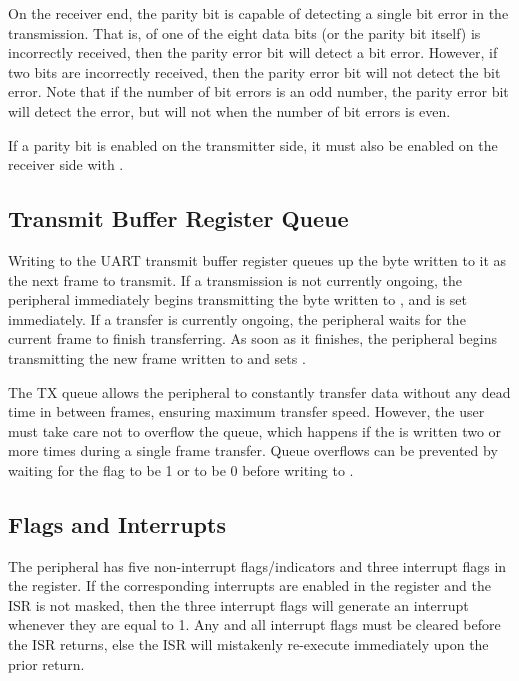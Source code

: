 On the receiver end, the parity bit is capable of detecting a single bit error in the transmission. That is, of one of the eight data bits (or the parity bit itself) is incorrectly received, then the parity error bit  will detect a bit error. However, if two bits are incorrectly received, then the parity error bit will not detect the bit error. Note that if the number of bit errors is an odd number, the parity error bit will detect the error, but will not when the number of bit errors is even.

If a parity bit is enabled on the transmitter side, it must also be enabled on the receiver side with .



\subsection{Transmit Buffer Register Queue}

Writing to the UART transmit buffer register  queues up the byte written to it as the next frame to transmit. If a transmission is not currently ongoing, the  peripheral immediately begins transmitting the byte written to , and  is set immediately. If a transfer is currently ongoing, the  peripheral waits for the current frame to finish transferring. As soon as it finishes, the  peripheral begins transmitting the new frame written to  and sets .

The TX queue allows the  peripheral to constantly transfer data without any dead time in between frames, ensuring maximum transfer speed. However, the user must take care not to overflow the queue, which happens if the  is written two or more times during a single frame transfer. Queue overflows can be prevented by waiting for the  flag to be 1 or  to be 0 before writing to .



\subsection{Flags and Interrupts}

The  peripheral has five non-interrupt flags/indicators and three interrupt flags in the  register. If the corresponding interrupts are enabled in the  register and the  ISR is not masked, then the three interrupt flags will generate an interrupt whenever they are equal to 1. Any and all interrupt flags must be cleared before the  ISR returns, else the ISR will mistakenly re-execute immediately upon the prior return.


